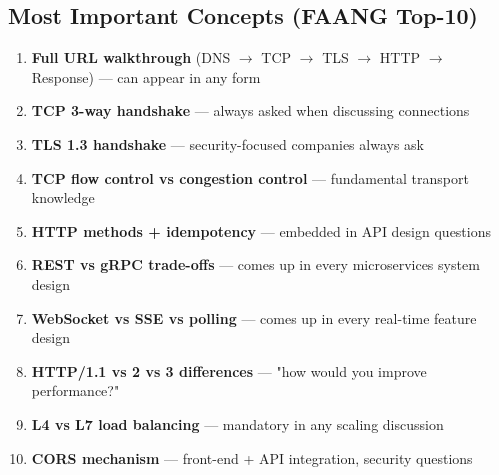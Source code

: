 \documentclass[11pt]{article}
\providecommand{\tightlist}{\setlength{\itemsep}{1pt}\setlength{\parskip}{0pt}}
\begin{document}
\subsection{Most Important Concepts (FAANG Top-10)}\label{most-important-concepts-faang-top-10}

\begin{enumerate}
\def\labelenumi{\arabic{enumi}.}
\tightlist
\item
  \textbf{Full URL walkthrough} (DNS \(\rightarrow\) TCP \(\rightarrow\) TLS \(\rightarrow\) HTTP \(\rightarrow\) Response) --- can appear in any form
\item
  \textbf{TCP 3-way handshake} --- always asked when discussing connections
\item
  \textbf{TLS 1.3 handshake} --- security-focused companies always ask
\item
  \textbf{TCP flow control vs congestion control} --- fundamental transport knowledge
\item
  \textbf{HTTP methods + idempotency} --- embedded in API design questions
\item
  \textbf{REST vs gRPC trade-offs} --- comes up in every microservices system design
\item
  \textbf{WebSocket vs SSE vs polling} --- comes up in every real-time feature design
\item
  \textbf{HTTP/1.1 vs 2 vs 3 differences} --- "how would you improve performance?"
\item
  \textbf{L4 vs L7 load balancing} --- mandatory in any scaling discussion
\item
  \textbf{CORS mechanism} --- front-end + API integration, security questions
\end{enumerate}
\end{document}
